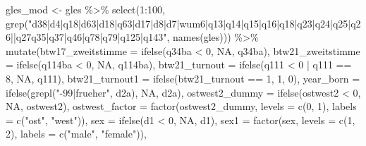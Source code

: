 \documentclass[
]{article}
\newenvironment{Shaded}{\begin{snugshade}}{\end{snugshade}}
\newcommand{\AttributeTok}[1]{\textcolor[rgb]{0.77,0.63,0.00}{#1}}
\newcommand{\ConstantTok}[1]{\textcolor[rgb]{0.00,0.00,0.00}{#1}}
\newcommand{\DecValTok}[1]{\textcolor[rgb]{0.00,0.00,0.81}{#1}}
\newcommand{\FunctionTok}[1]{\textcolor[rgb]{0.00,0.00,0.00}{#1}}
\newcommand{\NormalTok}[1]{#1}
\newcommand{\OtherTok}[1]{\textcolor[rgb]{0.56,0.35,0.01}{#1}}
\newcommand{\SpecialCharTok}[1]{\textcolor[rgb]{0.00,0.00,0.00}{#1}}
\newcommand{\StringTok}[1]{\textcolor[rgb]{0.31,0.60,0.02}{#1}}
\begin{document}
\begin{Shaded}
\begin{Highlighting}[]
\NormalTok{gles\_mod }\OtherTok{\textless{}{-}}\NormalTok{ gles }\SpecialCharTok{\%\textgreater{}\%} 
  \FunctionTok{select}\NormalTok{(}\DecValTok{1}\SpecialCharTok{:}\DecValTok{100}\NormalTok{, }\FunctionTok{grep}\NormalTok{(}\StringTok{"d38|d4|q18|d63|d18|q63|d17|d8|d7|wum6|q13|q14|q15|q16|q18|q23|q24|q25|q26||q27q35|q37|q46|q78|q79|q125|q143"}\NormalTok{, }\FunctionTok{names}\NormalTok{(gles))) }\SpecialCharTok{\%\textgreater{}\%}
  \FunctionTok{mutate}\NormalTok{(}\AttributeTok{btw17\_zweitstimme =} \FunctionTok{ifelse}\NormalTok{(q34ba }\SpecialCharTok{\textless{}} \DecValTok{0}\NormalTok{, }\ConstantTok{NA}\NormalTok{, q34ba),}
         \AttributeTok{btw21\_zweitstimme =} \FunctionTok{ifelse}\NormalTok{(q114ba }\SpecialCharTok{\textless{}} \DecValTok{0}\NormalTok{, }\ConstantTok{NA}\NormalTok{, q114ba),}
         \AttributeTok{btw21\_turnout =} \FunctionTok{ifelse}\NormalTok{(q111 }\SpecialCharTok{\textless{}} \DecValTok{0} \SpecialCharTok{|}\NormalTok{ q111 }\SpecialCharTok{==} \DecValTok{8}\NormalTok{, }\ConstantTok{NA}\NormalTok{, q111),}
         \AttributeTok{btw21\_turnout1 =} \FunctionTok{ifelse}\NormalTok{(btw21\_turnout }\SpecialCharTok{==} \DecValTok{1}\NormalTok{, }\DecValTok{1}\NormalTok{, }\DecValTok{0}\NormalTok{),}
         \AttributeTok{year\_born =} \FunctionTok{ifelse}\NormalTok{(}\FunctionTok{grepl}\NormalTok{(}\StringTok{"{-}99|frueher"}\NormalTok{, d2a), }\ConstantTok{NA}\NormalTok{, d2a),}
         \AttributeTok{ostwest2\_dummy =} \FunctionTok{ifelse}\NormalTok{(ostwest2 }\SpecialCharTok{\textless{}} \DecValTok{0}\NormalTok{, }\ConstantTok{NA}\NormalTok{, ostwest2),}
         \AttributeTok{ostwest\_factor =} \FunctionTok{factor}\NormalTok{(ostwest2\_dummy, }
                                 \AttributeTok{levels =} \FunctionTok{c}\NormalTok{(}\DecValTok{0}\NormalTok{, }\DecValTok{1}\NormalTok{), }
                                 \AttributeTok{labels =} \FunctionTok{c}\NormalTok{(}\StringTok{"ost"}\NormalTok{, }\StringTok{"west"}\NormalTok{)),}
         \AttributeTok{sex =} \FunctionTok{ifelse}\NormalTok{(d1 }\SpecialCharTok{\textless{}} \DecValTok{0}\NormalTok{, }\ConstantTok{NA}\NormalTok{, d1),}
         \AttributeTok{sex1 =} \FunctionTok{factor}\NormalTok{(sex, }
                       \AttributeTok{levels =} \FunctionTok{c}\NormalTok{(}\DecValTok{1}\NormalTok{, }\DecValTok{2}\NormalTok{), }
                       \AttributeTok{labels =} \FunctionTok{c}\NormalTok{(}\StringTok{"male"}\NormalTok{, }\StringTok{"female"}\NormalTok{)),}

\end{Highlighting}
\end{Shaded}
\end{document}

